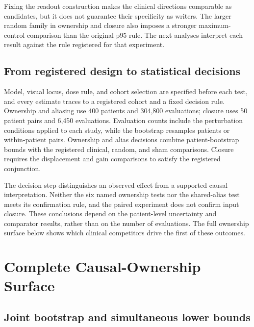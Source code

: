 Fixing the readout construction makes the clinical directions comparable
as candidates, but it does not guarantee their specificity as writers.
The larger random family in ownership and closure also imposes a stronger
maximum-control comparison than the original p95 rule. The next analyses
interpret each result against the rule registered for that experiment.

\subsection{From registered design to statistical decisions}

Model, visual locus, dose rule, and cohort selection are specified before
each test, and every estimate traces to a registered cohort and a fixed
decision rule.
Ownership and aliasing use 400 patients and 304,800 evaluations; closure
uses 50 patient pairs and 6,450 evaluations. Evaluation counts include the
perturbation conditions applied to each study, while the bootstrap resamples
patients or within-patient pairs. Ownership and alias decisions combine
patient-bootstrap bounds with the registered clinical, random, and sham
comparisons. Closure requires the displacement and gain comparisons to
satisfy the registered conjunction.


The decision step distinguishes an observed effect from a supported causal
interpretation. Neither the six named ownership tests nor the shared-alias
test meets its confirmation rule, and the paired experiment does not
confirm input closure. These conclusions depend on the patient-level
uncertainty and comparator results, rather than on the number of evaluations.
The full ownership surface below shows which clinical competitors drive
the first of these outcomes.

\FloatBarrier

\section{Complete Causal-Ownership Surface}
\label{app:ownership}

\subsection{Joint bootstrap and simultaneous lower bounds}
\label{app:simultaneous-bounds}

